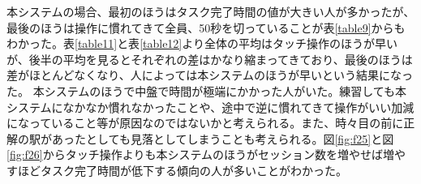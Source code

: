 \documentclass[11pt,a4j, titlepage]{jarticle} %
\begin{document}

本システムの場合、最初のほうはタスク完了時間の値が大きい人が多かったが、最後のほうは操作に慣れてきて全員、50秒を切っていることが表\ref{table9}からもわかった。表\ref{table11}と表\ref{table12}より全体の平均はタッチ操作のほうが早いが、後半の平均を見るとそれぞれの差はかなり縮まってきており、最後のほうは差がほとんどなくなり、人によっては本システムのほうが早いという結果になった。
本システムのほうで中盤で時間が極端にかかった人がいた。練習しても本システムになかなか慣れなかったことや、途中で逆に慣れてきて操作がいい加減になっていること等が原因なのではないかと考えられる。また、時々目の前に正解の駅があったとしても見落としてしまうことも考えられる。図\ref{fig:f25}と図\ref{fig:f26}からタッチ操作よりも本システムのほうがセッション数を増やせば増やすほどタスク完了時間が低下する傾向の人が多いことがわかった。
\end{document}

